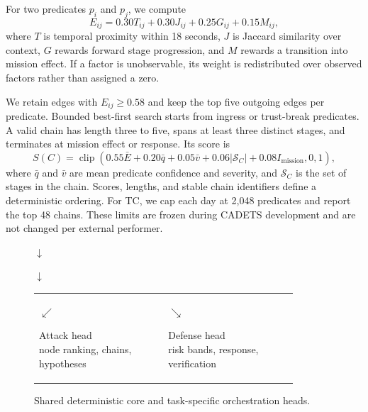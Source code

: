 \documentclass[runningheads]{llncs}
\begin{document}
For two predicates $p_i$ and $p_j$, we compute
\begin{equation}
E_{ij}=0.30T_{ij}+0.30J_{ij}+0.25G_{ij}+0.15M_{ij},
\label{eq:edge}
\end{equation}
where $T$ is temporal proximity within 18 seconds, $J$ is Jaccard similarity over context, $G$ rewards forward stage progression, and $M$ rewards a transition into mission effect. If a factor is unobservable, its weight is redistributed over observed factors rather than assigned a zero.

We retain edges with $E_{ij}\geq0.58$ and keep the top five outgoing edges per predicate. Bounded best-first search starts from ingress or trust-break predicates. A valid chain has length three to five, spans at least three distinct stages, and terminates at mission effect or response. Its score is
\begin{equation}
S(C)=\operatorname{clip}\left(
0.55\bar{E}+0.20\bar{q}+0.05\bar{v}
+0.06|\mathcal{S}_C|+0.08I_{\mathrm{mission}},0,1\right),
\label{eq:chain}
\end{equation}
where $\bar{q}$ and $\bar{v}$ are mean predicate confidence and severity, and $\mathcal{S}_C$ is the set of stages in the chain. Scores, lengths, and stable chain identifiers define a deterministic ordering. For TC, we cap each day at 2,048 predicates and report the top 48 chains. These limits are frozen during CADETS development and are not changed per external performer.

\begin{figure}[t]
\centering
\small
{}
\par\vspace{2pt}
$\downarrow$
\par\vspace{2pt}
\par\vspace{2pt}
$\downarrow$
\par\vspace{2pt}
\par\vspace{4pt}
\begin{tabular}{p{0.43\linewidth}p{0.43\linewidth}}
\centering$\swarrow$\par
\fbox{\parbox{0.88\linewidth}{\centering Attack head\\node ranking, chains, hypotheses}} &
\centering$\searrow$\par
\fbox{\parbox{0.88\linewidth}{\centering Defense head\\risk bands, response, verification}}
\end{tabular}
\caption{Shared deterministic core and task-specific orchestration heads.}
\label{fig:architecture}
\end{figure}
\end{document}
